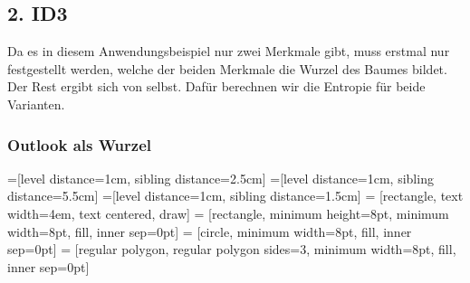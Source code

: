 \documentclass{article}
\begin{document}
\subsection*{2. ID3}
Da es in diesem Anwendungsbeispiel nur zwei Merkmale gibt, muss erstmal nur
festgestellt werden, welche der beiden Merkmale die Wurzel des Baumes
bildet. Der Rest ergibt sich von selbst. Dafür berechnen wir die Entropie für
beide Varianten.

\subsubsection*{Outlook als Wurzel}
=[level distance=1cm, sibling distance=2.5cm]
=[level distance=1cm, sibling distance=5.5cm]
=[level distance=1cm, sibling distance=1.5cm]
 = [rectangle, text width=4em, text centered, draw]
 = [rectangle, minimum height=8pt, minimum width=8pt, fill, inner sep=0pt]
 = [circle, minimum width=8pt, fill, inner sep=0pt]
 = [regular polygon, regular polygon sides=3, minimum width=8pt, fill, inner sep=0pt]

\\[1em]
\end{document}
